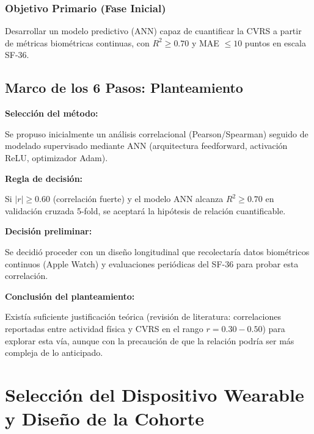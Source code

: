 \documentclass[12pt,letterpaper,twoside]{report}
\begin{document}
\subsection{Objetivo Primario (Fase Inicial)}

Desarrollar un modelo predictivo (ANN) capaz de cuantificar la CVRS a partir de métricas biométricas continuas, con $R^2 \geq 0.70$ y MAE $\leq 10$ puntos en escala SF-36.

\section{Marco de los 6 Pasos: Planteamiento}

\begin{estadisticobox}
\textbf{Selección del método:}

Se propuso inicialmente un análisis correlacional (Pearson/Spearman) seguido de modelado supervisado mediante ANN (arquitectura feedforward, activación ReLU, optimizador Adam).
\end{estadisticobox}

\begin{reglabox}
\textbf{Regla de decisión:}

Si $|r| \geq 0.60$ (correlación fuerte) y el modelo ANN alcanza $R^2 \geq 0.70$ en validación cruzada 5-fold, se aceptará la hipótesis de relación cuantificable.
\end{reglabox}

\begin{decisionbox}
\textbf{Decisión preliminar:}

Se decidió proceder con un diseño longitudinal que recolectaría datos biométricos continuos (Apple Watch) y evaluaciones periódicas del SF-36 para probar esta correlación.
\end{decisionbox}

\begin{conclusionbox}
\textbf{Conclusión del planteamiento:}

Existía suficiente justificación teórica (revisión de literatura: correlaciones reportadas entre actividad física y CVRS en el rango $r=0.30-0.50$) para explorar esta vía, aunque con la precaución de que la relación podría ser más compleja de lo anticipado.
\end{conclusionbox}

\chapter{Selección del Dispositivo Wearable y Diseño de la Cohorte}
\end{document}
